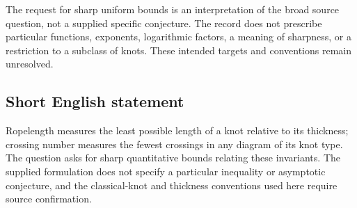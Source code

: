 \documentclass[11pt]{article}
\begin{document}
The request for sharp uniform bounds is an interpretation of the broad source question, not a supplied specific conjecture. The record does not prescribe particular functions, exponents, logarithmic factors, a meaning of sharpness, or a restriction to a subclass of knots. These intended targets and conventions remain unresolved.
\subsection{Short English statement}
Ropelength measures the least possible length of a knot relative to its thickness; crossing number measures the fewest crossings in any diagram of its knot type. The question asks for sharp quantitative bounds relating these invariants. The supplied formulation does not specify a particular inequality or asymptotic conjecture, and the classical-knot and thickness conventions used here require source confirmation.
\end{document}
